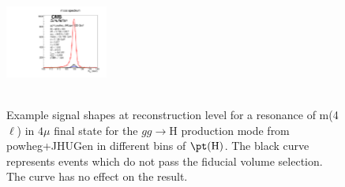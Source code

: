\begin{figure}[htb]
\begin{center}
{      \includegraphics[width=0.3\textwidth,angle=0]{Figures/Appendix//ggH_powheg_JHUgen_125_4mu_pT4l_genbin4_recobin4_effs_genWeight*pileupWeight*dataMCWeight.pdf}
      \label{fig:sigfits-pT4l-ggH-powheg15-JHUgen-125-maintext:e}
    }
     \\
    \\
    \caption{ Example signal shapes at reconstruction level for a resonance of m(4$\ell$) in $4\mu$ final state for the $gg\rightarrow \mathrm{H}$ production mode from {\sc powheg+JHUGen} in different bins of $\pt(\mathrm{H})$. The black curve represents events which do not pass the fiducial volume selection. The curve has no effect on the result.
    }
  \label{fig:sigfits-pT4l-ggH-powheg15-JHUgen-125-maintext}
 \end{center}
\end{figure} \clearpage



